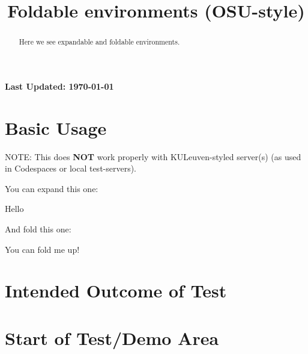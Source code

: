 \documentclass{ximera}
\title{Foldable environments (OSU-style)}
\begin{document}
\begin{abstract}
  Here we see expandable and foldable environments.
\end{abstract}
\maketitle

{{\Huge \bfseries Last Updated: \today}} \\

\section{Basic Usage}

NOTE: This does \textbf{NOT} work properly with KULeuven-styled server(s) (as used in Codespaces or local test-servers).


You can expand this one:

\begin{expandable}
  Hello
 \begin{center}
 \end{center}
\end{expandable}



And fold this one:

\begin{foldable}
  You can fold me up!
\end{foldable}


\section{Intended Outcome of Test}



\section{Start of Test/Demo Area}


\hrulefill
\end{document}
